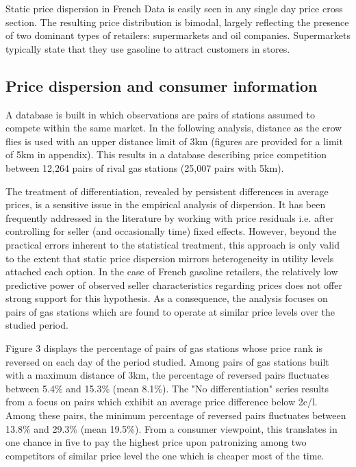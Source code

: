 \documentclass[english]{article}
\begin{document}
Static price dispersion in French Data is easily seen in any single day price cross section. The resulting price distribution is bimodal, largely reflecting the presence of two dominant types of retailers: supermarkets and oil companies. Supermarkets typically state that they use gasoline to attract customers in stores.

\subsection{Price dispersion and consumer information}

A database is built in which observations are pairs of stations assumed to compete within the same market. In the following analysis, distance as the crow flies is used with an upper distance limit of 3km (figures are provided for a limit of 5km in appendix). This results in a database describing price competition between 12,264 pairs of rival gas stations (25,007 pairs with 5km).

The treatment of differentiation, revealed by persistent differences in average prices, is a sensitive issue in the empirical analysis of dispersion. It has been frequently addressed in the literature by working with price residuals i.e. after controlling for seller (and occasionally time) fixed effects. However, beyond the practical errors inherent to the statistical treatment, this approach is only valid to the extent that static price dispersion mirrors heterogeneity in utility levels attached each option. In the case of French gasoline retailers, the relatively low predictive power of observed seller characteristics regarding prices does not offer strong support for this hypothesis. As a consequence, the analysis focuses on pairs of gas stations which are found to operate at similar price levels over the studied period.

Figure 3 displays the percentage of pairs of gas stations whose price rank is reversed on each day of the period studied. Among pairs of gas stations built with a maximum distance of 3km, the percentage of reversed pairs fluctuates between 5.4\% and 15.3\%  (mean 8.1\%). The "No differentiation" series results from a focus on pairs which exhibit an average price difference below 2c/l. Among these pairs, the minimum percentage of reversed pairs fluctuates between 13.8\% and 29.3\% (mean 19.5\%). From a consumer viewpoint, this translates in one chance in five to pay the highest price upon patronizing among two competitors of similar price level the one which is cheaper most of the time.
\end{document}
